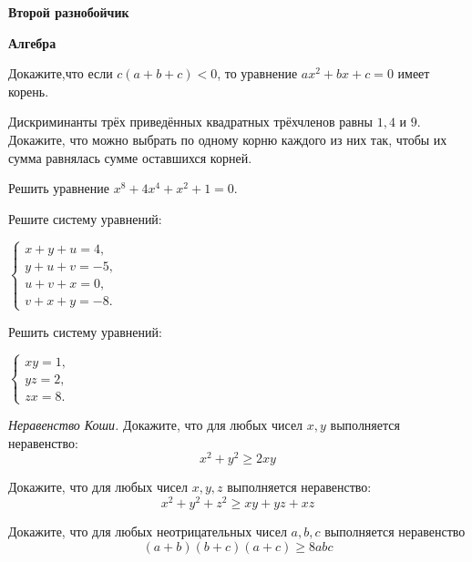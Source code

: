 \centerline{\Huge \bf  Второй разнобойчик}
\centerline{\Huge \bf Алгебра}

\begin{flushright}
    \scriptsize{}
\end{flushright}

Докажите,что если $c(a+b+c)<0$, то уравнение $ax^2+bx+c=0$ имеет корень.

Дискриминанты трёх приведённых квадратных трёхчленов равны $1, 4$ и $9.$ Докажите, что можно выбрать по одному корню каждого из них так, чтобы их сумма равнялась сумме оставшихся корней.

Решить уравнение  $x^8 + 4x^4 + x^2 + 1 = 0.$

Решите систему уравнений:

\noindent
$\begin{cases}
    x + y + u = 4,\\
    y + u + v = -5,\\
    u + v + x = 0,\\
    v + x + y = -8.
 \end{cases}$

Решить систему уравнений:

\noindent
$\begin{cases}
    xy = 1,\\
    yz = 2,\\
    zx = 8.
 \end{cases}$

\textit{Неравенство Коши.} Докажите, что для любых чисел $x, y$ выполняется неравенство: 
\[x^2 + y^2 \geq 2xy \]

Докажите, что для любых чисел  $x, y, z$ выполняется неравенство:
\[x^2 + y^2 + z^2 \geq xy + yz + xz \]

Докажите, что для любых неотрицательных чисел $a, b, c$ выполняется неравенство 
\[(a+b)(b+c)(a+c) \geq 8abc \]

